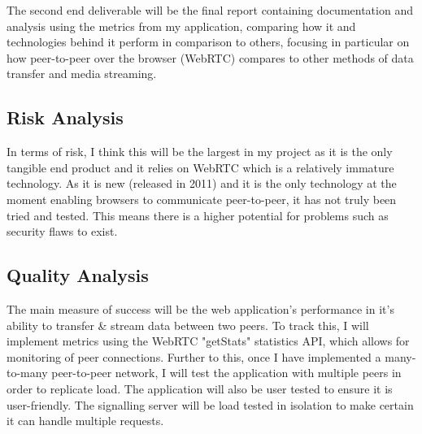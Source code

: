 \documentclass[]{report}
\begin{document}
			The second end deliverable will be the final report containing documentation and analysis using the metrics from my application, comparing how it and technologies behind it perform in comparison to others, focusing in particular on how peer-to-peer over the browser (WebRTC) compares to other methods of data transfer and media streaming.
			
			\subsection*{Risk Analysis}
			In terms of risk, I think this will be the largest in my project as it is the only tangible end product and it relies on WebRTC which is a relatively immature technology. As it is new (released in 2011) and it is the only technology at the moment enabling browsers to communicate peer-to-peer, it has not truly been tried and tested. This means there is a higher potential for problems such as security flaws to exist. 
		
			\subsection*{Quality Analysis}
			The main measure of success will be the web application's performance in it's ability to transfer \& stream data between two peers. To track this, I will implement metrics using the WebRTC "getStats" statistics API, which allows for monitoring of peer connections. Further to this, once I have implemented a many-to-many peer-to-peer network, I will test the application with multiple peers in order to replicate load. The application will also be user tested to ensure it is user-friendly. The signalling server will be load tested in isolation to make certain it can handle multiple requests. 

			\newpage
\end{document}
